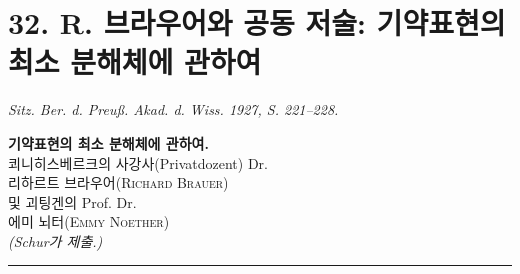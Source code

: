 \documentclass[11pt]{article}
\begin{document}
\section*{32. R. 브라우어와 공동 저술: 기약표현의 최소 분해체에 관하여}
\emph{Sitz. Ber. d. Preuß. Akad. d. Wiss. 1927, S. 221--228.}

\begin{center}
{\Large\bfseries 기약표현의 최소 분해체에 관하여.}\\[1.0em]
쾨니히스베르크의 사강사(Privatdozent) Dr.\\
\textsc{리하르트 브라우어(Richard Brauer)}\\
및 괴팅겐의 Prof. Dr.\\
\textsc{에미 뇌터(Emmy Noether)}\\[0.8em]
\emph{(Schur가 제출.)}\\[0.5em]
\rule{4em}{0.4pt}
\end{center}
\end{document}
